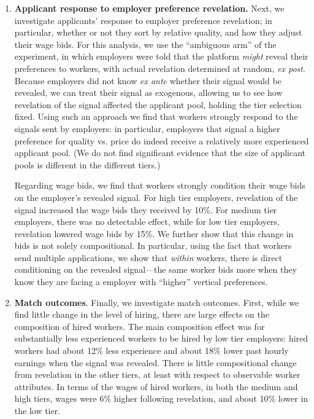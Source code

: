 \begin{enumerate}
\item {\bf Applicant response to employer preference revelation.}  Next, we investigate applicants' response to employer preference revelation; in particular, whether or not they sort by relative quality, and how they adjust their wage bids.
For this analysis, we use the  ``ambiguous arm'' of the experiment, in which employers were told that the platform \emph{might} reveal their preferences to workers, with actual revelation determined at random, \emph{ex post}. 
Because employers did not know \emph{ex ante} whether their signal would be revealed, we can treat their signal as exogenous, allowing us to see how revelation of the signal affected the applicant pool, holding the tier selection fixed.
Using such an approach we find that workers strongly respond to the signals sent by employers: in particular, employers that signal a higher preference for quality vs. price do indeed receive a relatively more experienced applicant pool.
(We do not find significant evidence that the size of applicant pools is different in the different tiers.)


Regarding wage bids, we find that workers strongly condition their wage bids on the employer's revealed signal.
For high tier employers, revelation of the signal increased the wage bids they received by 10\%.
For medium tier employers, there was no detectable effect, while for low tier employers, revelation lowered wage bids by 15\%.
We further show that this change in bids is not solely compositional. 
In particular, using the fact that workers send multiple applications, we show that \emph{within} workers, there is direct conditioning on the revealed signal---the same worker bids more when they know they are facing a employer with ``higher'' vertical preferences.

\item {\bf Match outcomes}.  Finally, we investigate  match outcomes.  First, while we find little change in the level of hiring, there are large effects on the composition of hired workers. 
The main composition effect was for substantially less experienced workers to be hired by low tier employers:
hired workers had about 12\% less experience and about 18\% lower past hourly earnings when the signal was revealed.
There is little compositional change from revelation in the other tiers, at least with respect to observable worker attributes.
In terms of the wages of hired workers, in both the medium and high tiers, wages were 6\% higher following revelation, and about 10\% lower in the low tier. 


\end{enumerate}
